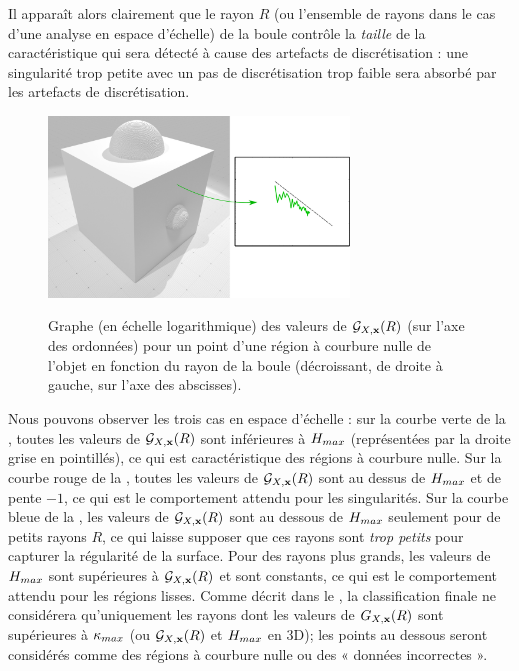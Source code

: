 Il apparaît alors clairement que le rayon $R$ (ou l'ensemble de rayons dans le
cas d'une analyse en espace d'échelle) de la boule contrôle la \emph{taille} de
la caractéristique qui sera détecté à cause des artefacts de discrétisation :
une singularité trop petite avec un pas de discrétisation trop faible sera
absorbé par les artefacts de discrétisation.
%
\begin{figure}[ht]
\begin{center}
  {\includegraphics[width=8cm]{figures/CubeSpherePlot_F_NoColor}}
  \caption{Graphe (en échelle logarithmique) des valeurs de $\mathcal{G}_{X,\mathbf{x}}(R)$ (sur
  l'axe des ordonnées) pour un point d'une région à courbure nulle de l'objet
  \CubeSphere en fonction du rayon de la boule (décroissant, de droite à gauche,
  sur l'axe des abscisses).\label{fig:CubeSpherePlot_F_NoColor}}
\end{center}
\end{figure}
%
Nous pouvons observer les trois cas en espace d'échelle : sur la courbe verte de
la , toutes les valeurs de $\mathcal{G}_{X,\mathbf{x}}(R)$
sont inférieures à $H_{max}$ (représentées par la droite grise en
pointillés), ce qui est caractéristique des régions à courbure nulle. Sur la
courbe rouge de la , toutes les valeurs
de $\mathcal{G}_{X,\mathbf{x}}(R)$ sont au dessus de $H_{max}$ et de pente $-1$, ce qui est le
comportement attendu pour les singularités. Sur la courbe bleue de la
, les valeurs de $\mathcal{G}_{X,\mathbf{x}}(R)$ sont au
dessous de $H_{max}$ seulement pour de petits rayons $R$, ce qui laisse
supposer que ces rayons sont \emph{trop petits} pour capturer la régularité de
la surface. Pour des rayons plus grands, les valeurs de $H_{max}$ sont
supérieures à $\mathcal{G}_{X,\mathbf{x}}(R)$ et sont constants, ce qui est le comportement attendu
pour les régions lisses. Comme décrit dans le
, la classification
finale ne considérera qu'uniquement les rayons dont les valeurs de $G_{X,\mathbf{x}}(R)$
sont supérieures à $\kappa_{max}$ (ou $\mathcal{G}_{X,\mathbf{x}}(R)$ et $H_{max}$ en 3D); les
points au dessous seront considérés comme des régions à courbure nulle ou des «
données incorrectes ».
%

